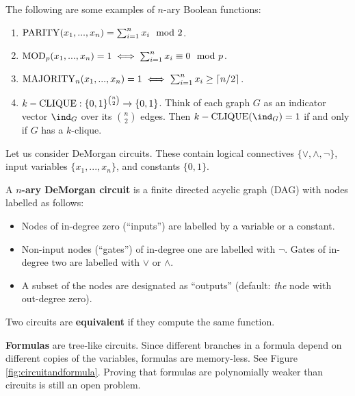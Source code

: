 \documentclass[11pt]{article}
\begin{document}
	\begin{example}
		The following are some examples of $n$-ary Boolean functions:
		\begin{enumerate}
			\item $\mathrm{PARITY}(x_1, ..., x_n) = \sum_{i = 1}^{n} x_i \mod 2$.
			\item $\mathrm{MOD}_p(x_1, ..., x_n) = 1 \iff \sum_{i = 1}^{n} x_i \equiv 0 \mod p$.
			\item $\mathrm{MAJORITY}_n(x_1, ..., x_n) = 1 \iff \sum_{i=1}^{n} x_i \geq \lceil n/2\rceil$.
			\item $k-\mathrm{CLIQUE}: \{0,1\}^{\binom{n}{2}} \rightarrow \{0,1\}$. Think of each graph $G$ as an indicator vector $\ind_G$ over its $\binom{n}{2}$ edges. Then $k-\ff{CLIQUE}(\ind_G) = 1$ if and only if $G$ has a $k$-clique.
		\end{enumerate}
	\end{example}
	
	Let us consider DeMorgan circuits. These contain logical connectives $\{\lor, \land, \lnot\}$, input variables $\{x_1, ..., x_n\}$, and constants $\{0,1\}$. 
	
	\begin{definition}
		\label{def:demorgancircuit}
		A \textbf{$n$-ary DeMorgan circuit} is a finite directed acyclic graph (DAG) with nodes labelled as follows:
		\begin{itemize}
			\item Nodes of in-degree zero (``inputs'') are labelled by a variable or a constant.
			\item Non-input nodes (``gates'') of in-degree one are labelled with $\lnot$. Gates of in-degree two are labelled with $\lor$ or $\land$.
			\item A subset of the nodes are designated as ``outputs'' (default: \emph{the} node with out-degree zero).
		\end{itemize}
		Two circuits are \textbf{equivalent} if they compute the same function.
	\end{definition}
	
	\textbf{Formulas} are tree-like circuits. Since different branches in a formula depend on different copies of the variables, formulas are memory-less. See Figure \ref{fig:circuitandformula}. Proving that formulas are polynomially weaker than circuits is still an open problem.
	
\end{document}
